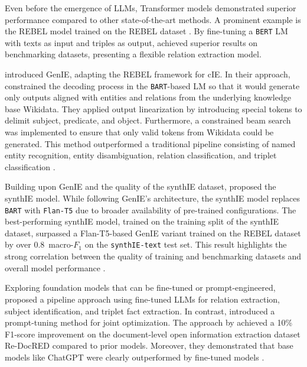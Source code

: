 \documentclass[a4paper,oneside,bibliography=totoc]{scrbook}
\begin{document}
Even before the emergence of \acp{LLM}, Transformer models demonstrated superior performance compared to other state-of-the-art methods. A prominent example is the REBEL model trained on the REBEL dataset \cite{HuguetCabot2021}. By fine-tuning a \texttt{BERT} \ac{LM} with texts as input and triples as output, \citet{HuguetCabot2021} achieved superior results on benchmarking datasets, presenting a flexible relation extraction model.

\citet{Josifoski2021} introduced GenIE, adapting the REBEL framework for \ac{cIE}. In their approach, \citet{Josifoski2021} constrained the decoding process in the \texttt{BART}-based \ac{LM} so that it would generate only outputs aligned with entities and relations from the underlying knowledge base Wikidata. They applied output linearization by introducing special tokens to delimit subject, predicate, and object. Furthermore, a constrained beam search was implemented to ensure that only valid tokens from Wikidata could be generated. This method outperformed a traditional pipeline consisting of named entity recognition, entity disambiguation, relation classification, and triplet classification \cite{Josifoski2021}.

Building upon GenIE and the quality of the synthIE dataset, \citet{Josifoski2023} proposed the synthIE model. While following GenIE’s architecture, the synthIE model replaces \texttt{BART} with \texttt{Flan-T5} due to broader availability of pre-trained configurations. The best-performing synthIE model, trained on the training split of the synthIE dataset, surpassed a Flan-T5-based GenIE variant trained on the REBEL dataset by over 0.8~macro-$F_{1}$ on the \texttt{synthIE-text} test set. This result highlights the strong correlation between the quality of training and benchmarking datasets and overall model performance \cite{Josifoski2023}.

Exploring foundation models that can be fine-tuned or prompt-engineered, \citet{Xue2024} proposed a pipeline approach using fine-tuned \acp{LLM} for relation extraction, subject identification, and triplet fact extraction. In contrast, \citet{Chen2024} introduced a prompt-tuning method for joint optimization. The approach by \citet{Xue2024} achieved a 10\% F1-score improvement on the document-level open information extraction dataset Re-DocRED compared to prior models. Moreover, they demonstrated that base models like ChatGPT were clearly outperformed by fine-tuned models \cite{Xue2024}.
\end{document}
